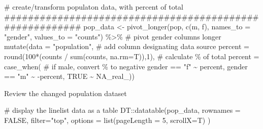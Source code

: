 \documentclass[
]{article}
\newenvironment{Shaded}{\begin{snugshade}}{\end{snugshade}}
\newcommand{\CommentTok}[1]{\textcolor[rgb]{0.50,0.62,0.50}{#1}}
\newcommand{\DataTypeTok}[1]{\textcolor[rgb]{0.87,0.87,0.75}{#1}}
\newcommand{\DecValTok}[1]{\textcolor[rgb]{0.86,0.86,0.80}{#1}}
\newcommand{\KeywordTok}[1]{\textcolor[rgb]{0.94,0.87,0.69}{#1}}
\newcommand{\NormalTok}[1]{\textcolor[rgb]{0.80,0.80,0.80}{#1}}
\newcommand{\OperatorTok}[1]{\textcolor[rgb]{0.94,0.94,0.82}{#1}}
\newcommand{\OtherTok}[1]{\textcolor[rgb]{0.94,0.94,0.56}{#1}}
\newcommand{\StringTok}[1]{\textcolor[rgb]{0.80,0.58,0.58}{#1}}
\begin{document}
\begin{Shaded}
\begin{Highlighting}[]
\CommentTok{\# create/transform populaton data, with percent of total}
\CommentTok{\#\#\#\#\#\#\#\#\#\#\#\#\#\#\#\#\#\#\#\#\#\#\#\#\#\#\#\#\#\#\#\#\#\#\#\#\#\#\#\#\#\#\#\#\#\#\#\#\#\#\#\#\#\#\#\#}
\NormalTok{pop\_data \textless{}{-}}\StringTok{ }\KeywordTok{pivot\_longer}\NormalTok{(pop, }\KeywordTok{c}\NormalTok{(m, f), }\DataTypeTok{names\_to =} \StringTok{"gender"}\NormalTok{, }\DataTypeTok{values\_to =} \StringTok{"counts"}\NormalTok{) }\OperatorTok{\%\textgreater{}\%}\StringTok{ }\CommentTok{\# pivot gender columns longer}
\StringTok{  }\KeywordTok{mutate}\NormalTok{(}\DataTypeTok{data =} \StringTok{"population"}\NormalTok{,                                                         }\CommentTok{\# add column designating data source}
         \DataTypeTok{percent  =} \KeywordTok{round}\NormalTok{(}\DecValTok{100}\OperatorTok{*}\NormalTok{(counts }\OperatorTok{/}\StringTok{ }\KeywordTok{sum}\NormalTok{(counts, }\DataTypeTok{na.rm=}\NormalTok{T)),}\DecValTok{1}\NormalTok{),                     }\CommentTok{\# calculate \% of total}
         \DataTypeTok{percent  =} \KeywordTok{case\_when}\NormalTok{(                                                        }\CommentTok{\# if male, convert \% to negative}
\NormalTok{                            gender }\OperatorTok{==}\StringTok{ "f"} \OperatorTok{\textasciitilde{}}\StringTok{ }\NormalTok{percent,}
\NormalTok{                            gender }\OperatorTok{==}\StringTok{ "m"} \OperatorTok{\textasciitilde{}}\StringTok{ }\OperatorTok{{-}}\NormalTok{percent,}
                            \OtherTok{TRUE}          \OperatorTok{\textasciitilde{}}\StringTok{ }\OtherTok{NA\_real\_}\NormalTok{))}
\end{Highlighting}
\end{Shaded}

Review the changed population dataset

\begin{Shaded}
\begin{Highlighting}[]
\CommentTok{\# display the linelist data as a table}
\NormalTok{DT}\OperatorTok{::}\KeywordTok{datatable}\NormalTok{(pop\_data, }\DataTypeTok{rownames =} \OtherTok{FALSE}\NormalTok{, }\DataTypeTok{filter=}\StringTok{"top"}\NormalTok{, }\DataTypeTok{options =} \KeywordTok{list}\NormalTok{(}\DataTypeTok{pageLength =} \DecValTok{5}\NormalTok{, }\DataTypeTok{scrollX=}\NormalTok{T) )}
\end{Highlighting}
\end{Shaded}
\end{document}
